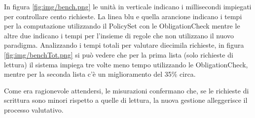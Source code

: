In figura \ref{fig:img/bench.png} le unità in verticale indicano i millisecondi impiegati per controllare cento richieste.
La linea blu e quella arancione indicano i tempi per la computazione utilizzando il PolicySet con le ObligationCheck
mentre le altre due indicano i tempi per l'insieme di regole che non utilizzano il nuovo paradigma.
Analizzando i tempi totali per valutare diecimila richieste, in figura \ref{fig:img/benchTot.png} si può vedere che
per la prima lista (solo richieste di lettura) il sistema impiega tre volte meno tempo utilizzando le ObligationCheck, mentre per la
seconda lista c'è un miglioramento del 35\% circa.

Come era ragionevole attendersi, le misurazioni confermano che, se le richieste di scrittura sono minori rispetto a quelle di lettura, la nuova gestione
alleggerisce il processo valutativo.
